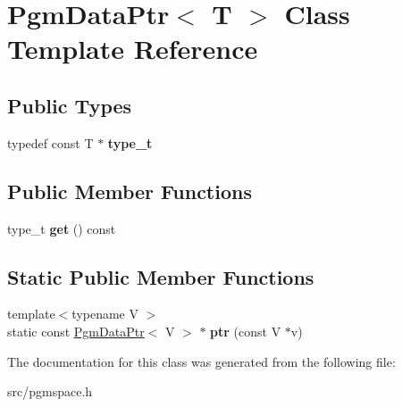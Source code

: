 \hypertarget{classPgmDataPtr}{}\section{Pgm\+Data\+Ptr$<$ T $>$ Class Template Reference}
\label{classPgmDataPtr}
\subsection*{Public Types}
\begin{DoxyCompactItemize}
\item 
typedef const T $\ast$ {\bfseries type\+\_\+t}\hypertarget{classPgmDataPtr_a1c723887632424e9f6fb422cf3725d5b}{}\label{classPgmDataPtr_a1c723887632424e9f6fb422cf3725d5b}

\end{DoxyCompactItemize}
\subsection*{Public Member Functions}
\begin{DoxyCompactItemize}
\item 
type\+\_\+t {\bfseries get} () const \hypertarget{classPgmDataPtr_ad42fcec7ad9f68492f08570b4beecbbf}{}\label{classPgmDataPtr_ad42fcec7ad9f68492f08570b4beecbbf}

\end{DoxyCompactItemize}
\subsection*{Static Public Member Functions}
\begin{DoxyCompactItemize}
\item 
{\footnotesize template$<$typename V $>$ }\\static const \hyperlink{classPgmDataPtr}{Pgm\+Data\+Ptr}$<$ V $>$ $\ast$ {\bfseries ptr} (const V $\ast$v)\hypertarget{classPgmDataPtr_a4ca4a1c1032d8f8092fc2b46426e2566}{}\label{classPgmDataPtr_a4ca4a1c1032d8f8092fc2b46426e2566}

\end{DoxyCompactItemize}


The documentation for this class was generated from the following file\+:\begin{DoxyCompactItemize}
\item 
src/pgmspace.\+h\end{DoxyCompactItemize}
